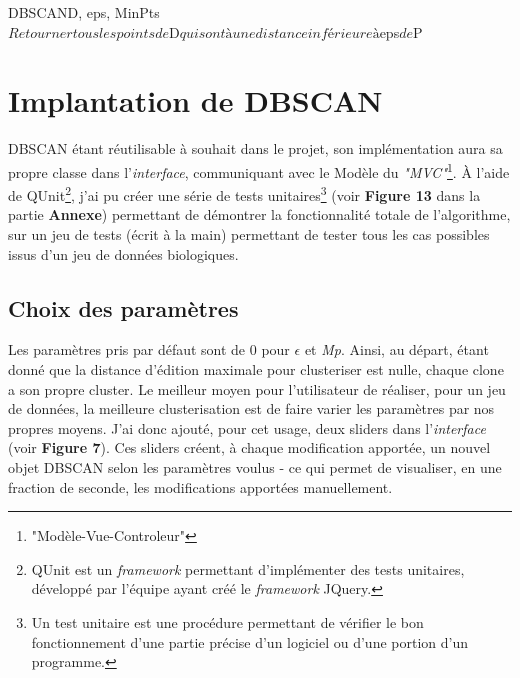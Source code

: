 \documentclass[pdftex,12pt,a4paper]{report}
\begin{document}
\begin{spacing}{1.2}
\begin{pseudocode}{DBSCAN}{D, eps, MinPts}
\\
	$Retourner tous les points de $D$ qui sont à une distance inférieure à $eps$ de $P
\ENDPROCEDURE
\end{pseudocode}

\section{Implantation de DBSCAN}

DBSCAN étant réutilisable à souhait dans le projet, son implémentation aura sa propre classe dans l'\textit{interface}, communiquant avec le Modèle du \textit{"MVC"}\footnote{"Modèle-Vue-Controleur"}.
À l'aide de QUnit\footnote{QUnit est un \textit{framework} permettant d'implémenter des tests unitaires, développé par l'équipe ayant créé le \textit{framework} JQuery.}, j'ai pu créer une série de tests unitaires\footnote{Un test unitaire est une procédure permettant de vérifier le bon fonctionnement d'une partie précise d'un logiciel ou d'une portion d'un programme.} (voir \textbf{Figure 13} dans la partie \textbf{Annexe}) permettant de démontrer la fonctionnalité totale de l'algorithme, sur un jeu de tests (écrit à la main) permettant de tester tous les cas possibles issus d'un jeu de données biologiques.

\subsection{Choix des paramètres}

Les paramètres pris par défaut sont de 0 pour $\epsilon$ et \textit{Mp}. Ainsi, au départ, étant donné que la distance d'édition maximale pour clusteriser est nulle, chaque clone a son propre cluster.
\newline
Le meilleur moyen pour l'utilisateur de réaliser, pour un jeu de données, la meilleure clusterisation est de faire varier les paramètres par nos propres moyens.
J'ai donc ajouté, pour cet usage, deux sliders dans l'\textit{interface} (voir \textbf{Figure 7}).
Ces sliders créent, à chaque modification apportée, un nouvel objet DBSCAN selon les paramètres voulus - ce qui permet de visualiser, en une fraction de seconde, les modifications apportées manuellement.


\end{spacing}
\end{document}
